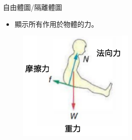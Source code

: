 \documentclass[beamer=true]{standalone}
\begin{document}



\begin{frame}{自由體圖/隔離體圖}
    \begin{itemize}
        \item 顯示所有作用於物體的力。\bigskip
    \end{itemize}
    \begin{figure}[h!]
        \centering
        \includegraphics[width=0.5\textwidth]{assets/d2f67986.png}
    \end{figure}
\end{frame}
\end{document}
